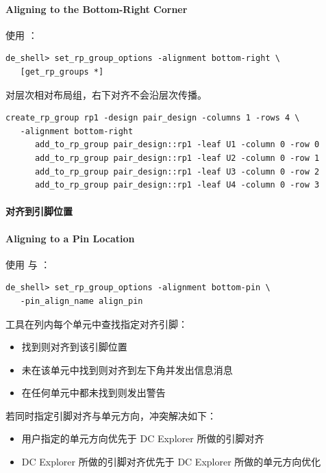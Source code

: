 \paragraph*{Aligning to the Bottom-Right Corner}

使用 ：
\begin{lstlisting}
de_shell> set_rp_group_options -alignment bottom-right \
   [get_rp_groups *]
\end{lstlisting}

\begin{noteBox}
对层次相对布局组，右下对齐不会沿层次传播。
\end{noteBox}

\begin{lstlisting}
create_rp_group rp1 -design pair_design -columns 1 -rows 4 \
   -alignment bottom-right
      add_to_rp_group pair_design::rp1 -leaf U1 -column 0 -row 0
      add_to_rp_group pair_design::rp1 -leaf U2 -column 0 -row 1
      add_to_rp_group pair_design::rp1 -leaf U3 -column 0 -row 2
      add_to_rp_group pair_design::rp1 -leaf U4 -column 0 -row 3
\end{lstlisting}


\paragraph{对齐到引脚位置}
\paragraph*{Aligning to a Pin Location}

使用  与 ：
\begin{lstlisting}
de_shell> set_rp_group_options -alignment bottom-pin \
   -pin_align_name align_pin
\end{lstlisting}

工具在列内每个单元中查找指定对齐引脚：
\begin{itemize}
  \item 找到则对齐到该引脚位置
  \item 未在该单元中找到则对齐到左下角并发出信息消息
  \item 在任何单元中都未找到则发出警告
\end{itemize}

若同时指定引脚对齐与单元方向，冲突解决如下：
\begin{itemize}
  \item 用户指定的单元方向优先于 DC Explorer 所做的引脚对齐
  \item DC Explorer 所做的引脚对齐优先于 DC Explorer 所做的单元方向优化
\end{itemize}


